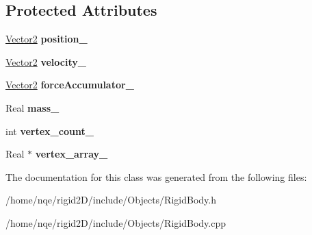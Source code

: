 \subsection*{Protected Attributes}
\begin{DoxyCompactItemize}
\item 
\hypertarget{class_rigid2_d_1_1_rigid_body_ab2e789b05cc467d7f78ea112bdcca5a5}{
\hyperlink{class_rigid2_d_1_1_vector2}{Vector2} {\bfseries position\_\-}}
\label{class_rigid2_d_1_1_rigid_body_ab2e789b05cc467d7f78ea112bdcca5a5}

\item 
\hypertarget{class_rigid2_d_1_1_rigid_body_abbb64d1419fb056b338b7c5c112ea077}{
\hyperlink{class_rigid2_d_1_1_vector2}{Vector2} {\bfseries velocity\_\-}}
\label{class_rigid2_d_1_1_rigid_body_abbb64d1419fb056b338b7c5c112ea077}

\item 
\hypertarget{class_rigid2_d_1_1_rigid_body_ad293bd44d6f25bd84f1993d2b8d4de63}{
\hyperlink{class_rigid2_d_1_1_vector2}{Vector2} {\bfseries forceAccumulator\_\-}}
\label{class_rigid2_d_1_1_rigid_body_ad293bd44d6f25bd84f1993d2b8d4de63}

\item 
\hypertarget{class_rigid2_d_1_1_rigid_body_a78aef9f27b258742e35bce6d0517dade}{
Real {\bfseries mass\_\-}}
\label{class_rigid2_d_1_1_rigid_body_a78aef9f27b258742e35bce6d0517dade}

\item 
\hypertarget{class_rigid2_d_1_1_rigid_body_abe37fff167092f6d25f02fbafbbbce70}{
int {\bfseries vertex\_\-count\_\-}}
\label{class_rigid2_d_1_1_rigid_body_abe37fff167092f6d25f02fbafbbbce70}

\item 
\hypertarget{class_rigid2_d_1_1_rigid_body_a3922a58ff583458c88fe56b3af514330}{
Real $\ast$ {\bfseries vertex\_\-array\_\-}}
\label{class_rigid2_d_1_1_rigid_body_a3922a58ff583458c88fe56b3af514330}

\end{DoxyCompactItemize}


The documentation for this class was generated from the following files:\begin{DoxyCompactItemize}
\item 
/home/nqe/rigid2D/include/Objects/RigidBody.h\item 
/home/nqe/rigid2D/include/Objects/RigidBody.cpp\end{DoxyCompactItemize}
